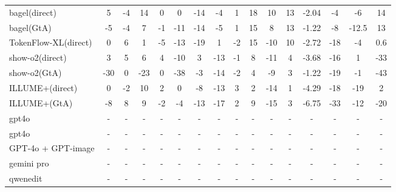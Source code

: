 \documentclass{article}
\theoremstyle{plain}
\theoremstyle{definition}
\theoremstyle{remark}
\begin{document}
\begin{table}[!htbp]
{\begin{tabular}{@{}lccccccccccccccc@{}}
bagel(direct) & 5 & -4 & 14 & 0 & 0 & -14 & -4 & 1 & 18 & 10 & 13 & -2.04 & -4 & -6 & 14 \\
bagel(GtA) & -5 & -4 & 7 & -1 & -11 & -14 & -5 & 1 & 15 & 8 & 13 & -1.22 & -8 & -12.5 & 13 \\
TokenFlow-XL(direct) & 0 & 6 & 1 & -5 & -13 & -19 & 1 & -2 & 15 & -10 & 10 & -2.72 & -18 & -4 & 0.6 \\
show-o2(direct) & 3 & 5 & 6 & 4 & -10 & 3 & -13 & -1 & 8 & -11 & 4 & -3.68 & -16 & 1 & -33 \\
show-o2(GtA) & -30 & 0 & -23 & 0 & -38 & -3 & -14 & -2 & 4 & -9 & 3 & -1.22 & -19 & -1 & -43 \\
ILLUME+(direct) & 0 & -2 & 10 & 2 & 0 & -8 & -13 & 3 & 2 & -14 & 1 & -4.29 & -18 & -19 & 2 \\
ILLUME+(GtA) & -8 & 8 & 9 & -2 & -4 & -13 & -17 & 2 & 9 & -15 & 3 & -6.75 & -33 & -12 & -20 \\
\midrule
\rowcolor{orange!8}
gpt4o & - & - & - & - & - & - & - & - & - & - & - & - & - & - & - \\
gpt4o & - & - & - & - & - & - & - & - & - & - & - & - & - & - & - \\
\midrule
GPT-4o + GPT-image & - & - & - & - & - & - & - & - & - & - & - & - & - & - & - \\
gemini pro & - & - & - & - & - & - & - & - & - & - & - & - & - & - & - \\
qwenedit & - & - & - & - & - & - & - & - & - & - & - & - & - & - & - \\
\bottomrule
\end{tabular}%
}
\end{table}
\end{document}
